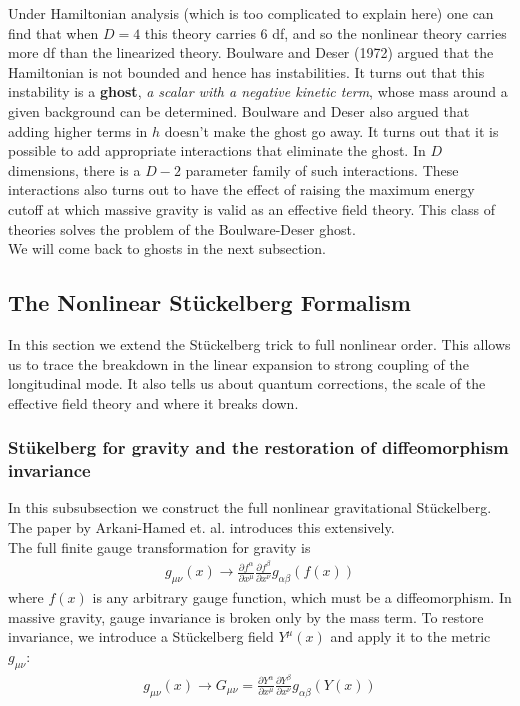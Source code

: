 \documentclass{book}
\theoremstyle{definition}
\newcommand{\p}{\partial}
\newcommand{\al}{\alpha}
\newcommand{\be}{\beta}
\newcommand{\f}[2]{\frac{#1}{#2}}
\begin{document}
Under Hamiltonian analysis (which is too complicated to explain here) one can find that when $D=4$ this theory carries 6 df, and so the nonlinear theory carries more df than the linearized theory. Boulware and Deser (1972) argued that the Hamiltonian is not bounded and hence has instabilities. It turns out that this instability is a \textbf{ghost}, \textit{a scalar with a negative kinetic term}, whose mass around a given background can be determined. Boulware and Deser also argued that adding higher terms in $h$ doesn't make the ghost go away. It turns out that it is possible to add appropriate interactions that eliminate the ghost. In $D$ dimensions, there is a $D-2$ parameter family of such interactions. These interactions also turns out to have the effect of raising the maximum energy cutoff at which massive gravity is valid as an effective field theory. This class of theories solves the problem of the Boulware-Deser ghost. \\

We will come back to ghosts in the next subsection. 










\newpage


\subsection{The Nonlinear St\"{u}ckelberg Formalism}


In this section we extend the St\"{u}ckelberg trick to full nonlinear order. This allows us to trace the breakdown in the linear expansion to strong coupling of the longitudinal mode. It also tells us about quantum corrections, the scale of the effective field theory and where it breaks down.  




\subsubsection{St\"{u}kelberg for gravity and the restoration of diffeomorphism invariance}


In this subsubsection we construct the full nonlinear gravitational St\"{u}ckelberg. The paper by Arkani-Hamed et. al. introduces this extensively. \\

The full finite gauge transformation for gravity is
\begin{align}
g_{\mu\nu}(x) \to \f{\p f^\al}{\p x^\mu} \f{\p f^\be}{\p x^\nu} g_{\al\be}(f(x))
\end{align}
where $f(x)$ is any arbitrary gauge function, which must be a diffeomorphism. In massive gravity, gauge invariance is broken only by the mass term. To restore invariance, we introduce a St\"{u}ckelberg field $Y^\mu(x)$ and apply it to the metric $g_{\mu\nu}$:
\begin{align}
\boxed{g_{\mu\nu}(x) \to G_{\mu\nu} = \f{\p Y^\al}{\p x^\mu} \f{\p Y^\be}{\p x^\nu} g_{\al\be}(Y(x))}
\end{align}
\end{document}
